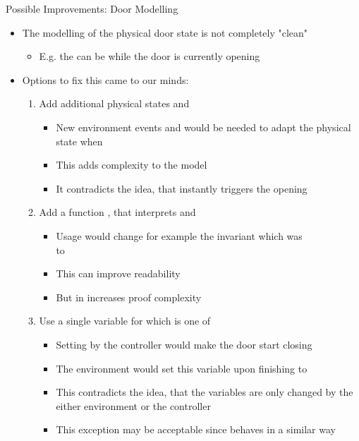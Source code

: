 \documentclass[
	hyperref={pdfusetitle,hidelinks},
	10pt,
    handout,
]{beamer}
\begin{document}
\begin{frame}{Possible Improvements: Door Modelling} %
	\begin{itemize}
		\item The modelling of the physical door state is not completely "clean"
		\begin{itemize}
			\item E.g. the  can be  while the door is currently opening
		\end{itemize}
		\item Options to fix this came to our minds:
		\begin{enumerate}
			\item Add additional physical states  and 
			\begin{itemize}
				\item New environment events  and  would be needed to adapt the physical state when 
				\item This adds complexity to the model
				\item It contradicts the idea, that  instantly triggers the opening
			\end{itemize}
			\item Add a function , that interprets  and 
			\begin{itemize}
				\item Usage would change for example the invariant  which was
				\\to
				\item This can improve readability
				\item But in increases proof complexity
			\end{itemize}
			\item Use a single variable for  which is one of 
			\begin{itemize}
				\item Setting  by the controller would make the door start closing
				\item The environment would set this variable upon finishing to 
				\item This contradicts the idea, that the variables are only changed by the either environment or the controller
				\item This exception may be acceptable since  behaves in a similar way
			\end{itemize}
		\end{enumerate}
	\end{itemize}
\end{frame}
\end{document}
